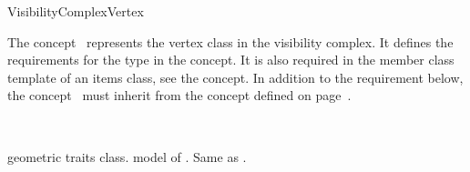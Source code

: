 
\ccRefPageBegin


\begin{ccRefConcept}{VisibilityComplexVertex}
\label{pageVCVertexRef}
  
\ccDefinition

The concept \ccRefName\ represents the vertex class in the visibility complex.
It defines the requirements for the  type in the
 concept. It is also required in the
 member class template of an items class, see the
 concept. In addition to the requirement below, the
concept \ccRefName\ must inherit from the  concept defined on
page~\pageref{pageBitangentRef}.
  
\ccInheritsFrom
{}\\

\ccTypes
{}
\ccThreeToTwo

 {geometric traits class. }
\ccGlue
{} {model of . Same as
.}

\ccGlue
{}
\ccGlue
{}

\ccGlue
{}
\ccGlue
{}


\end{ccRefConcept}
